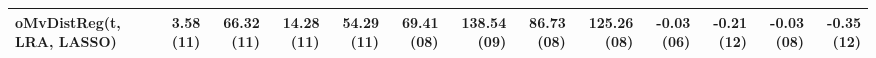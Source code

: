\begin{tabular}{lrrrrrrrrrrrr}
oMvDistReg(t, LRA, LASSO) & {\cellcolor[HTML]{D6A5A5}} \color[HTML]{000000} 3.58 (11) & {\cellcolor[HTML]{CF6969}} \color[HTML]{F1F1F1} 66.32 (11) & {\cellcolor[HTML]{D18181}} \color[HTML]{F1F1F1} 14.28 (11) & {\cellcolor[HTML]{CE6767}} \color[HTML]{F1F1F1} 54.29 (11) & {\cellcolor[HTML]{D9C0C0}} \color[HTML]{000000} 69.41 (08) & {\cellcolor[HTML]{DBD4D4}} \color[HTML]{000000} 138.54 (09) & {\cellcolor[HTML]{D9BFBF}} \color[HTML]{000000} 86.73 (08) & {\cellcolor[HTML]{DCD9D9}} \color[HTML]{000000} 125.26 (08) & {\cellcolor[HTML]{379797}} \color[HTML]{F1F1F1} -0.03 (06) & {\cellcolor[HTML]{D59D9D}} \color[HTML]{F1F1F1} -0.21 (12) & {\cellcolor[HTML]{DBD2D2}} \color[HTML]{000000} -0.03 (08) & {\cellcolor[HTML]{DAC7C7}} \color[HTML]{000000} -0.35 (12) \\
\bottomrule
\end{tabular}
